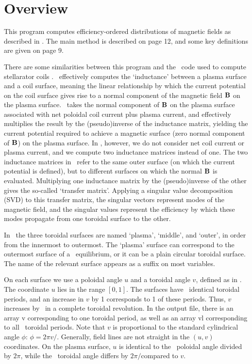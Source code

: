 \chapter{Overview}

This program computes efficiency-ordered distributions of magnetic fields as described in \cite{boozer2015}.  The main method is described on page 12, and some key definitions are given on page 9.

There are some similarities between this program and the \nescoil~code used to compute stellarator coils \cite{nescoil}.
\nescoil~effectively computes the `inductance' between a plasma surface and a coil surface, meaning the linear
relationship by which the current potential on the coil surface gives rise to a normal component of the magnetic field ${\mathbf B}$ on the plasma
surface.  \nescoil~takes the normal component of ${\mathbf B}$ on the plasma surface associated with net poloidal coil current plus plasma
current, and effectively multiplies the result by the (pseudo)inverse of the inductance matrix, yielding the current potential required
to achieve a magnetic surface (zero normal component of ${\mathbf B}$) on the plasma surface.  In \bdistrib, however,
we do not consider net coil current or plasma current, and we compute two inductance matrices instead of one.  The two inductance matrices
in \bdistrib~refer to the same outer surface (on which the current potential is defined), but to different surfaces on which the normal ${\mathbf B}$
is evaluated. Multiplying one inductance matrix by the (pseudo)inverse of the other gives the so-called `transfer matrix'.
Applying a singular value decomposition (SVD) to this transfer matrix, the singular vectors represent modes of the magnetic field,
and the singular values represent the efficiency by which these modes propagate from one toroidal surface to the other.

In \bdistrib~the three toroidal surfaces are named `plasma', `middle', and `outer', in order from the innermost to outermost. The
`plasma' surface can correspond to the outermost surface of a \vmec~equilibrium, or it can be a plain circular toroidal surface. The name
of the relevant surface appears as a suffix on most variables.

On each surface we use a poloidal angle $u$ and a toroidal angle $v$,
defined as in \nescoil.  The coordinate $u$ lies in the range $[0,1]$. The
surfaces have \nfp~identical toroidal periods, and an increase in $v$
by 1 corresponds to 1 of these periods. Thus, $v$ increases by \nfp~in a
complete toroidal revolution. In the output file, there is an array {\ttfamily v}
corresponding to one toroidal period, as well as an array {\ttfamily vl}
corresponding to all \nfp~toroidal periods.  Note that $v$ is
proportional to the standard cylindrical angle $\phi$: $\phi = 2\pi v/$\nfp.
Generally, field lines are not straight in the $(u,v)$ coordinates.  On
the plasma surface, $u$ is identical to the \vmec~poloidal angle divided
by $2\pi$, while the \vmec~toroidal angle differs by $2\pi/$\nfp compared to $v$.

